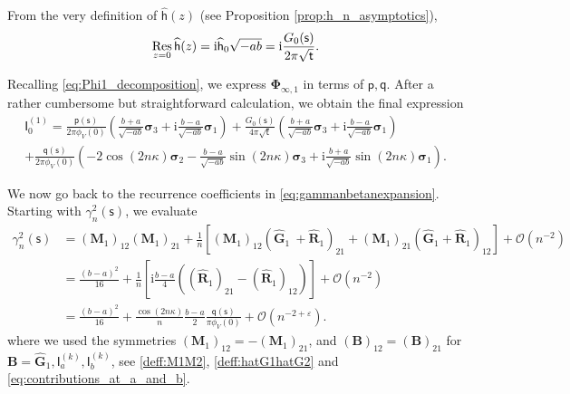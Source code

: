 \documentclass[reqno,a4paper,11pt]{amsart}
\newcommand{\res}{\mathop{\rm Res}}
\newcommand{\Boh}{\mathcal{O}}
\newcommand{\ii}{\mathrm{i}}
\renewcommand{\bm}{\mathbf}
\newcommand{\msf}{\mathsf}
\newcommand{\wh}{\widehat}
\renewcommand{\sp}{\boldsymbol \sigma}
\newcommand{\sad}{\msf s}
\theoremstyle{definition}
\theoremstyle{remark}
\numberwithin{equation}{section}
\begin{document}
    From the very definition of $\widehat{\msf h}(z)$ (see Proposition \ref{prop:h_n_asymptotics}),
    \[
        \res_{z = 0} \widehat{\msf h}(z) = \ii \widehat{\msf h}_0 \sqrt{-ab} = \ii \frac{G_0(\sad)}{2 \pi \sqrt{\msf t}}.
    \]

    Recalling \eqref{eq:Phi1_decomposition}, we express $\bm \Phi_{\infty,1}$ in terms of $\msf p,\msf q$. After a rather cumbersome but straightforward calculation, we obtain the final expression
    \begin{multline*}
        \msf I_0^{(1)} 
            = \frac{\msf p(\sad)}{2 \pi \phi_V(0)} \left( \frac{b+a}{\sqrt{-ab}} \sp_3 + \ii\frac{b-a}{\sqrt{-ab}} \sp_1 \right) 
        +  \frac{G_0(\sad)}{4 \pi\sqrt{\msf t}} \left( \frac{b+a}{\sqrt{-ab}} \sp_3 + \ii\frac{b-a}{\sqrt{-ab}} \sp_1 \right) \\
        +  \frac{\msf q(\sad)}{2 \pi \phi_V(0)} \left( -2\cos(2n\kappa) \sp_2 - \frac{b-a}{\sqrt{-ab}}\sin(2n\kappa) \sp_3 + \ii\frac{b+a}{\sqrt{-ab}}\sin(2n\kappa) \sp_1 \right).
    \end{multline*}

    
    

    We now go back to the recurrence coefficients in \eqref{eq:gammanbetanexpansion}. Starting with $\gamma_n^2(\sad)$, we evaluate 
    \[
    \begin{split}
        \gamma_n^2(\sad) 
            &= \left( \bm M_1\right)_{12}  \left( \bm M_1 \right)_{21} + \frac{1}{n} \left[ \left( \bm M_1\right)_{12} \left( \wh{\bm G}_1\ + \wh{\bm R}_1 \right)_{21} + \left( \bm M_1\right)_{21} \left( \wh{\bm G}_1 + \wh{\bm R}_1\right)_{12} \right] + \Boh(n^{- 2}) \\
            &= \frac{(b-a)^2}{16} + \frac{1}{n }\left[ \ii \frac{b-a}{4} \left(\left( \wh{\bm R}_1\right)_{21} - \left( \wh{\bm R}_1\right)_{12} \right) \right] + \Boh(n^{- 2}) \\
            &= \frac{(b-a)^2}{16} +\frac{\cos(2 n \kappa)}{n} \frac{b-a}{2} \frac{\msf q(\sad)}{\pi \phi_V(0)}  + \Boh(n^{ - 2+\varepsilon}).
    \end{split}
    \]
    where we used the symmetries $(\bm M_1)_{12}=-(\bm M_1)_{21}$, and $(\bm B )_{12}=(\bm B )_{21}$ for $\bm B =\wh{\bm G}_1, \msf I^{(k)}_a, \msf I^{(k)}_b$, see \eqref{deff:M1M2}, \eqref{deff:hatG1hatG2} and \eqref{eq:contributions_at_a_and_b}.
    
\end{document}
